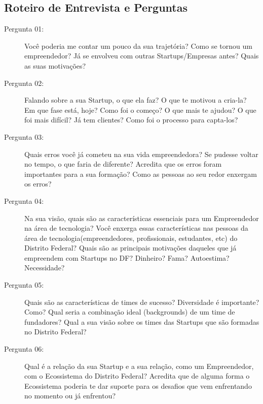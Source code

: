 \subsection{Roteiro de Entrevista e Perguntas}
\label{subsection:roteiro_de_entrevista_e_perguntas}

\begin{description}


  \item [Pergunta 01:] Você poderia me contar um pouco da sua trajetória? Como se tornou um empreendedor? Já se envolveu com outras Startups/Empresas antes? Quais as suas motivações? 

  \item [Pergunta 02:] Falando sobre a sua Startup, o que ela faz? O que te motivou a cria-la? Em que fase está, hoje? Como foi o começo? O que mais te ajudou? O que foi mais difícil? Já tem clientes? Como foi o processo para capta-los?


  \item [Pergunta 03:] Quais erros você já cometeu na sua vida empreendedora? Se pudesse voltar no tempo, o que faria de diferente? Acredita que os erros foram importantes para a sua formação? Como as pessoas ao seu redor enxergam os erros? 

  \item [Pergunta 04:] Na sua visão, quais são as características essenciais para um Empreendedor na área de tecnologia? Você enxerga essas características nas pessoas da área de tecnologia(empreendedores, profissionais, estudantes, etc) do Distrito Federal? Quais são as principais motivações daqueles que já empreendem com Startups no DF? Dinheiro? Fama? Autoestima? Necessidade?

  \item [Pergunta 05:] Quais são as características de times de sucesso? Diversidade é importante? Como? Qual seria a combinação ideal (backgrounds) de um time de fundadores? Qual a sua visão sobre os times das Startups que são formadas no Distrito Federal?
  

  \item [Pergunta 06:] Qual é a relação da sua Startup e a sua relação, como um Empreendedor, com o Ecossistema do Distrito Federal? Acredita que de alguma forma o Ecossistema poderia te dar suporte para os desafios que vem enfrentando no momento ou já enfrentou?


\end{description}
